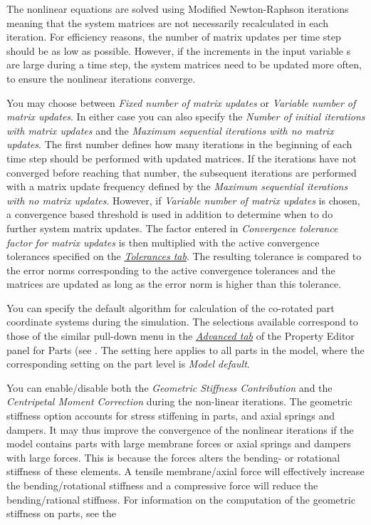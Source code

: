 {\begin{bulletlist}
  \setcounter{enumi}{2}
\item
  The nonlinear equations are solved using Modified Newton-Raphson iterations
  meaning that the system matrices are not necessarily recalculated in each
  iteration. For efficiency reasons, the number of matrix updates per time step
  should be as low as possible. However, if the increments in the input variable
  s are large during a time step, the system matrices need to be updated more
  often, to ensure the nonlinear iterations converge.

  You may choose between {\sl Fixed number of matrix updates} or
  {\sl Variable number of matrix updates}. In either case you can also specify
  the {\sl Number of initial iterations with matrix updates} and
  the {\sl Maximum sequential iterations with no matrix updates}.
  The first number defines how many iterations in the beginning of each time
  step should be performed with updated matrices. If the iterations have not
  converged before reaching that number, the subsequent iterations are performed
  with a matrix update frequency defined by the
  {\sl Maximum sequential iterations with no matrix updates}.
  However, if {\sl Variable number of matrix updates} is chosen,
  a convergence based threshold is used in addition to determine when to
  do further system matrix updates.
  The factor entered in {\sl Convergence tolerance factor for matrix updates}
  is then multiplied with the active convergence tolerances specified on the
  \protect\hyperlink{tolerances-tab}{\sl Tolerances tab}.
  The resulting tolerance is compared to the error norms corresponding to the
  active convergence tolerances and the matrices are updated
  as long as the error norm is higher than this tolerance.

\item You can specify the default algorithm for
  calculation of the co-rotated part coordinate systems during the simulation.
  The selections available correspond to those of the similar pull-down menu in
  the \protect\hyperlink{advanced-tab}{\sl Advanced tab} of the Property Editor
  panel for Parts (see .
  The setting here applies to all parts in the model, where the corresponding
  setting on the part level is {\sl Model default}.

\item You can enable/disable both the
  {\sl Geometric Stiffness Contribution} and the
  {\sl Centripetal Moment Correction} during the non-linear iterations.
  The geometric stiffness option accounts for stress stiffening in parts,
  and axial springs and dampers. It may thus improve the convergence of
  the nonlinear iterations if the model contains parts with large membrane
  forces or axial springs and dampers with large forces. This is because
  the forces alters the bending- or rotational stiffness of these elements.
  A tensile membrane/axial force will effectively increase the
  bending/rotational stiffness and a compressive force will reduce the
  bending/rational stiffness. For information on the computation of the
  geometric stiffness on parts, see the


\end{bulletlist}}

